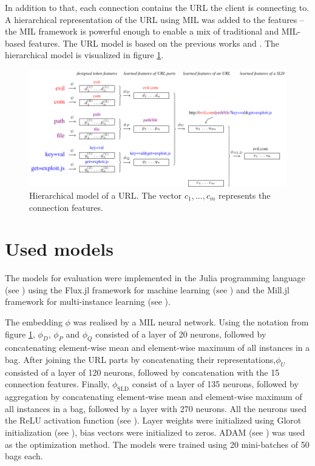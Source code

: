 In addition to that, each connection contains the URL the client is connecting to. A hierarchical representation of the URL using MIL was added to the features -- the MIL framework is powerful enough to enable a mix of traditional and MIL-based features. The URL model is based on the previous works \cite{dedic_hierarchicke_2017} and \cite{pevny_nested_2020}. The hierarchical model is visualized in figure \ref{fig:URL-model}.


\begin{figure}[h]
  \centering
  \includegraphics[width=\textwidth]{images/URL-model/URL-model.pdf}
  \caption{Hierarchical model of a URL. The vector \( c_1, \dots, c_m \) represents the connection features.}\label{fig:URL-model}
\end{figure}

\section{Used models}

The models for evaluation were implemented in the Julia programming language (see \cite{bezanson_julia:_2017}) using the Flux.jl framework for machine learning (see \cite{innes_flux:_2018}) and the Mill.jl framework for multi-instance learning (see \cite{pevny_milljl_2019}).

The embedding \( \phi \) was realised by a MIL neural network. Using the notation from figure \ref{fig:URL-model}, \( \phi_D \), \( \phi_P \) and \( \phi_Q \) consisted of a layer of 20 neurons, followed by concatenating element-wise mean and element-wise maximum of all instances in a bag. After joining the URL parts by concatenating their representations,\( \phi_U \) consisted of a layer of 120 neurons, followed by concatenation with the 15 connection features. Finally, \( \phi_\mathrm{SLD} \) consist of a layer of 135 neurons, followed by aggregation by concatenating element-wise mean and element-wise maximum of all instances in a bag, followed by a layer with 270 neurons. All the neurons used the ReLU activation function (see \cite{hahnloser_digital_2000}). Layer weights were initialized using Glorot initialization (see \cite{glorot_understanding_2010}), bias vectors were initialized to zeros. ADAM (see \cite{kingma_adam:_2014}) was used as the optimization method. The models were trained using 20 mini-batches of 50 bags each.

